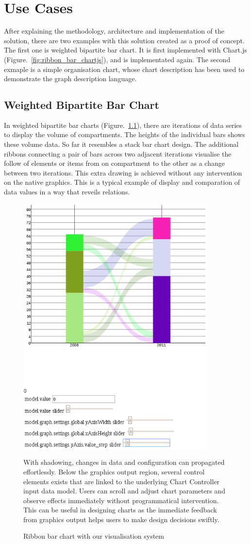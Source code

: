 \documentclass[11pt, a4paper]{report}
\begin{document}
\chapter{Use Cases}
After explaining the methodology, architecture and implementation of the solution, there are two examples with this solution created as a proof of concept. The first one is weighted bipartite bar chart. It is first implemented with Chart.js (Figure.~\ref{fig:ribbon_bar_chartjs}), and is implementated again. The second exmaple is a simple organisation chart, whose chart description has been used to demonstrate the graph description language.
\section{Weighted Bipartite Bar Chart}
In weighted bipartite bar charts (Figure.~\ref{fig:ribbon_bar_chart_vis}), there are iterations of data series to display the volume of compartments. The heights of the individual bars shows these volume data. So far it resembles a stack bar chart design. The additional ribbons connecting a pair of bars across two adjacent iterations visualise the follow of elements or items from on compartment to the other as a change between two iterations. This extra drawing is achieved without any intervention on the native graphics. This is a typical example of display and comparation of data values in a way that reveils relations.
\begin{figure}[f]
\centering
\includegraphics[width=10cm]{fig6_ribbon_bar_vis}
\caption{Ribbon bar chart with our visualisation system}
\label{fig:ribbon_bar_chart_vis}
With shadowing, changes in data and configuration can propagated effortlessly. Below the graphics output region, several control elements exists that are linked to the underlying Chart Controller input data model. Users can scroll and adjust chart parameters and observe effects immediately without programmatical intervention. This can be useful in designing charts as the immediate feedback from graphics output helps users to make design decisions swiftly.
\end{figure}
\end{document}
